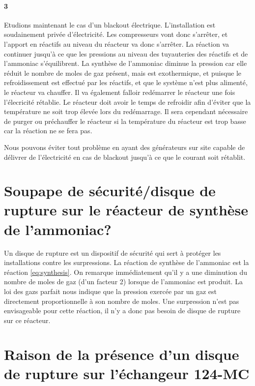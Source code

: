 \paragraph{3} Etudions maintenant le cas d'un blackout électrique. 
L'installation est soudainement privée d'électricité. 
Les compresseurs vont donc s'arrêter, et l'apport en réactifs au niveau 
du réacteur va donc s'arrêter.
La réaction va continuer jusqu'à ce que les pressions au niveau des tuyauteries 
des réactifs et de l'ammoniac s'équilibrent.
La synthèse de l'ammoniac diminue la pression car elle réduit le nombre de moles 
de gaz présent, mais est exothermique, et puisque le refroidissement est effectué 
par les réactifs, et que le système n'est plus alimenté, le réacteur va chauffer.
Il va également falloir redémarrer le réacteur une fois l'élecricité rétablie. 
Le réacteur doit avoir le temps de refroidir afin d'éviter 
que la température ne soit trop élevée lors du redémarrage. 
Il sera cependant nécessaire de purger ou préchauffer le réacteur si
la température du réacteur est trop basse car la réaction ne se fera pas.

Nous pouvons éviter tout problème en ayant des générateurs sur site capable 
de délivrer de l'électricité en cas de blackout jusqu'à ce que 
le courant soit rétablit. 

\section{Soupape de sécurité/disque de rupture sur le réacteur de synthèse de l'ammoniac?}

Un disque de rupture est un dispositif de sécurité qui sert à protéger les installations 
contre les surpressions.
La réaction de synthèse de l'ammoniac est la réaction \ref{eq:synthesis}.
On remarque immédiatement qu'il y a une diminution du nombre de moles de gaz (d'un facteur 2) 
lorsque de l'ammoniac est produit. La loi des gazs parfait nous indique que la pression
exercée par un gaz est directement proportionnelle à son nombre de moles.
Une surpression n'est pas envisageable pour cette réaction, 
il n'y a donc pas besoin de disque de rupture sur ce réacteur.

\section{Raison de la présence d'un disque de rupture sur l'échangeur 124-MC}

